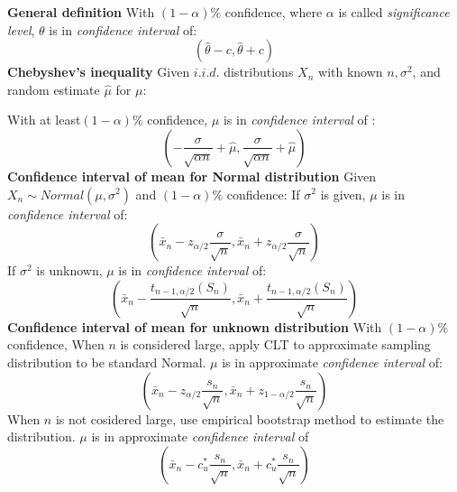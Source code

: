 \documentclass[a4paper]{article}
\begin{document}
\begin{mdframed}[style=Summary]
    \textbf{General definition}
    \newline
    With $(1-\alpha)\%$ confidence, where $\alpha$ is called \textit{significance level}, 
    \newline
    $\theta$ is in \textit{confidence interval} of:
    $$(\hat{\theta} -c, \hat{\theta} +c)$$
    \newline
    \textbf{Chebyshev's inequality}
    \newline
    Given $i.i.d.$ distributions $X_n$ with known $n, \sigma^2$, and random estimate $\hat{\mu}$ for $\mu$:
    
    With at least$(1-\alpha)\%$ confidence, $\mu$ is in \textit{confidence interval} of :
    $$(-\frac{\sigma}{\sqrt{\alpha n}}+\hat{\mu}, \frac{\sigma}{\sqrt{\alpha n}}+\hat{\mu})$$
    \newline
    \textbf{Confidence interval of mean for Normal distribution}
    \newline
    Given $X_n\sim Normal(\mu, \sigma^2)$ and $(1-\alpha)\%$ confidence:
    \newline
    If $\sigma^2$ is given, $\mu$ is in \textit{confidence interval} of:
    $$(\bar{x}_n -z_{\alpha/2}\frac{\sigma}{\sqrt{n}}, \bar{x}_n +z_{\alpha/2}\frac{\sigma}{\sqrt{n}})$$
    \newline
    If $\sigma^2$ is unknown, $\mu$ is in \textit{confidence interval} of:
    $$(\bar{x}_n -\frac{ t_{n-1,\alpha/2}(S_n)}{\sqrt{n}}, \bar{x}_n +\frac{ t_{n-1,\alpha/2}(S_n)}{\sqrt{n}})$$
    \newline
    \textbf{Confidence interval of mean for unknown distribution}
    \newline
    With $(1-\alpha)\%$ confidence,
    \newline
    When $n$ is considered large, apply CLT to approximate sampling distribution to be standard Normal.
    $\mu$ is in approximate \textit{confidence interval} of:
    $$(\bar{x}_n -z_{\alpha/2}\frac{s_n}{\sqrt{n}}, \bar{x}_n +z_{1-\alpha/2}\frac{s_n}{\sqrt{n}})$$
    \newline
    When $n$ is not cosidered large, use empirical bootstrap method to estimate the distribution.
    $\mu$ is in approximate \textit{confidence interval} of $$(\bar{x}_n -c^{*}_{u}\frac{s_n}{\sqrt{n}}, \bar{x}_n +c^{*}_{u}\frac{s_n}{\sqrt{n}})$$
\end{mdframed}
\end{document}
